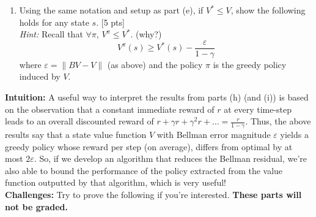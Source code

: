 \documentclass[11pt]{article}
\let\epsilon\varepsilon
\begin{document}
\begin{enumerate}
    \item[(i)] Using the same notation and setup as part (e), if $V^* \leq V$, show the following holds for any state $s$. [5 pts]\\
    \textit{Hint:} Recall that $\forall \pi$, $V^\pi \leq V^*$. (why?)
    \begin{equation}
        V^\pi(s) \geq V^*(s) - \frac{\epsilon}{1-\gamma}
    \end{equation}
     where $\epsilon = \|B V - V\|$  (as above) and the policy $\pi$ is the greedy policy induced by $V$. 
    
    \begin{tcolorbox}[breakable]

    \end{tcolorbox}
\end{enumerate}

\noindent \textbf{Intuition:} A useful way to interpret the results from parts (h) (and (i)) is based on the observation that a constant immediate reward of $r$ at every time-step leads to an overall discounted reward of $r + \gamma r + \gamma^2 r + \ldots = \frac{r}{1-\gamma}$. Thus, the above results say that a state value function $V$ with Bellman error magnitude $\epsilon$ yields a greedy policy whose reward per step (on average), differs from optimal by at most $2\epsilon$. So, if we develop an algorithm that reduces the Bellman residual, we're also able to bound the performance of the policy extracted from the value function outputted by that algorithm, which is very useful!
\\
\newpage
\noindent \textbf{Challenges:} Try to prove the following if you're interested. \textbf{These parts will not be graded.}
\end{document}
